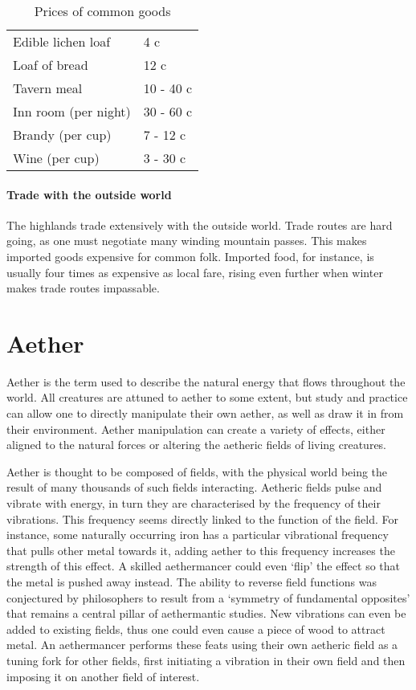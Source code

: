 \documentclass[a4paper,11pt,oneside]{book}
\begin{document}
\begin{table}[ht!]
	\centering
	\begin{tabular}{|l|l|}
		\hline
		Edible lichen loaf & 4 c\\ 
		Loaf of bread & 12 c \\
		Tavern meal & 10 - 40 c \\
		Inn room (per night) & 30 - 60 c \\
		Brandy (per cup) & 7 - 12 c \\
		Wine (per cup) & 3 - 30 c \\
		\hline		
	\end{tabular}
\caption{Prices of common goods}
\end{table}

\subsubsection{Trade with the outside world}
The highlands trade extensively with the outside world. Trade routes are hard going, as one must negotiate many winding mountain passes. This makes imported goods expensive for common folk. Imported food, for instance, is usually four times as expensive as local fare, rising even further when winter makes trade routes impassable. 

  



\chapter{Aether}
Aether is the term used to describe the natural energy that flows throughout the world. All creatures are attuned to aether to some extent, but study and practice can allow one to directly manipulate their own aether, as well as draw it in from their environment. Aether manipulation can create a variety of effects, either aligned to the natural forces or altering the aetheric fields of living creatures.

Aether is thought to be composed of fields, with the physical world being the result of many thousands of such fields interacting. Aetheric fields pulse and vibrate with energy, in turn they are characterised by the frequency of their vibrations. This frequency seems directly linked to the function of the field. For instance, some naturally occurring iron has a particular vibrational frequency that pulls other metal towards it, adding aether to this frequency increases the strength of this effect. A skilled aethermancer could even `flip' the effect so that the metal is pushed away instead. The ability to reverse field functions was conjectured by philosophers to result from a `symmetry of fundamental opposites' that remains a central pillar of aethermantic studies. New vibrations can even be added to existing fields, thus one could even cause a piece of wood to attract metal. An aethermancer performs these feats using their own aetheric field as a tuning fork for other fields, first initiating a vibration in their own field and then imposing it on another field of interest.
\end{document}
